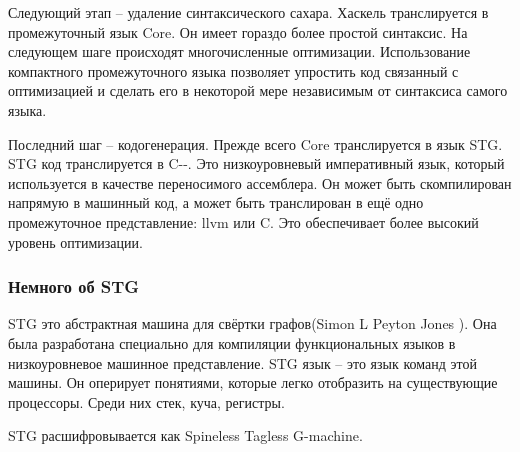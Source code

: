 \documentclass[fontsize=14pt, paper=a4, pagesize, DIV=calc]{scrartcl}
\begin{document}
Следующий этап -- удаление синтаксического сахара. Хаскель транслируется в
промежуточный язык Core. Он имеет гораздо более простой синтаксис. На следующем
шаге происходят многочисленные оптимизации. Использование компактного
промежуточного языка позволяет упростить код связанный с оптимизацией и сделать
его в некоторой мере независимым от синтаксиса самого языка.

Последний шаг -- кодогенерация. Прежде всего Core транслируется в язык STG.
STG код транслируется в C-{}-. Это низкоуровневый императивный язык, который
используется в качестве переносимого ассемблера. Он может быть скомпилирован
напрямую в машинный код, а может быть транслирован в ещё одно промежуточное
представление: llvm или C. Это обеспечивает более высокий уровень оптимизации.

\subsubsection{Немного об STG}

STG это абстрактная машина для свёртки графов(Simon L Peyton Jones
\cite{funcOnStockHard}). Она была разработана специально для компиляции
функциональных языков в низкоуровневое машинное представление.  STG язык -- это
язык команд этой машины. Он оперирует понятиями, которые легко отобразить на
существующие процессоры. Среди них стек, куча, регистры. 

STG расшифровывается как Spineless Tagless G-machine.
\end{document}
